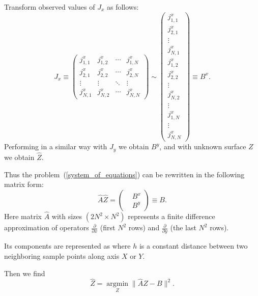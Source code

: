 \documentclass{beamer}
\begin{document}
\begin{frame}[allowframebreaks]
    Transform observed values of $J_x$ as follows:
    \begin{equation}
        \label{column-major_ordering}
        J_x \equiv
        \left(
            \begin{array}{cccc}
                j^x_{1,1} & j^x_{1,2} & \cdots & j^x_{1,N} \\
                j^x_{2,1} & j^x_{2,2} & \cdots & j^x_{2,N} \\
                \vdots & \vdots & \ddots & \vdots  \\
                j^x_{N,1} & j^x_{N,2} & \cdots & j^x_{N,N}
            \end{array}
        \right)
        \sim
        \left(
            \begin{array}{c}
                j^x_{1,1} \\
                j^x_{2,1} \\
                \vdots \\
                j^x_{N,1} \\
                j^x_{1,2} \\
                j^x_{2,2} \\
                \vdots \\
                j^x_{N,2} \\
                \vdots \\
                j^x_{1,N} \\
                \vdots \\
                j^x_{N,N}
            \end{array}
        \right)
        \equiv{}  B^x.
    \end{equation}
    Performing in a similar way with $J_y$ we obtain $B^y$, and with unknown surface $Z$ we obtain $\hat{Z}$.


    Thus the problem~(\ref{system_of_equations}) can be rewritten in the following matrix form:
    \begin{equation*}
        \label{matrix_equation}
        \hat{A} \hat{Z}  =
        \left(
        \begin{aligned}
            &B^x\\
            &B^y
        \end{aligned}
        \right)
        \equiv B.
    \end{equation*}
    Here matrix $\hat{A}$ with sizes $(2N^2 \times N^2)$ represents a finite difference approximation of operators $\frac{\partial}{\partial x}$ (first $N^2$ rows) and $\frac{\partial}{\partial y}$ (the last $N^2$ rows).

    \newpage

    Its components are represented as
    where $h$ is a constant distance between two neighboring sample points along axis $X$ or $Y$.

    Then we find
    \begin{equation*}
        \hat{Z} = \operatorname{argmin}\limits_Z \|\hat{A} Z - B\|^2.
    \end{equation*}
\end{frame}
\end{document}
